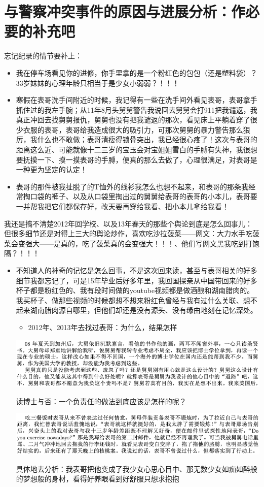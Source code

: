 \documentclass[9pt, b5paper]{article}
\begin{document}
\section{与警察冲突事件的原因与进展分析：作必要的补充吧}
\label{sec:org03eb449}
忘记纪录的情节要补上：
\begin{itemize}
\item 我在停车场看见你的进修，你手里拿的是一个粉红色的包包（还是塑料袋）？33岁妹妹的心理年龄只相当于是少女小弱弱？！！！

\item 寒假在表哥洗手间附近的时候，我记得有一些在洗手间外看见表哥，表哥拿手抓住过的我左手腕；从11年8月头舅舅警告我说回去舅舅会打911把我谴返，我真正冲回去找舅舅报仇，舅舅也没有把我谴返的那次，看见床上平躺着穿了很少衣服的表哥，表哥给我造成很大的吸引力，可那次舅舅的暴力警告那么狠厉，我什么也不敢做；表哥清瘦得锁骨突出，我已经很心疼了！这次与表哥的距离这么近、可能就像十二三岁的宝玉会对宝姐姐雪白的手膊有失神，我很想要抚摸一下、摸一摸表哥的手膊，便真的那么去做了，心理很满足，对表哥是一种更为坚定的认定！
\item 表哥的那件被我扯脱了的T恤外的线衫我怎么也想不起来，和表哥的那条我经常掏口袋的裤子、以及从口袋里掏出过的舅舅给表哥的表哥的小本儿，表哥要一并帮我把它们都保存好，改天要再穿给我看、把小本儿拿给我看！
\end{itemize}
我还是搞不清楚2012年回学校、以及13年春天的那些个舆论到底是怎么回事儿：
但很多细节还是对得上三大的舆论炒作，喜欢吃沙拉菠菜——网文：大力水手吃菠菜会变强大——是真的，吃了菠菜真的会变强大！！！、他们写网文黑我吃到打饱隔？！！！
\begin{itemize}
\item 不知道人的神奇的记忆是怎么回事，不是这次回来读，甚至与表哥相关的好多细节我都忘记了，可是15年毕业后好多年里，我回国探亲从中国带回来的好多杯子都是粉红色的、我有段时间做的youtube视频都是做酒酿和湖南腊肉的。我买杯子、做那些视频的时候都想不想来粉红色曾经与我有过什么关联、想不起来湖南腊肉源自哪里，但他们却还是没有源头、没有缘由地刻在记忆深处。 
\begin{itemize}
\item 2012年、2013年去找过表哥：为什么，结果怎样
\end{itemize}
\begin{center}
\includegraphics[width=.9\linewidth]{./pic/p1p136-5.png}
\end{center}
读博士与否：一个负责任的做法到底应该是怎样的呢？
\begin{center}
\includegraphics[width=.9\linewidth]{./pic/p1p125-2.png}
\end{center}
具体地去分析：我表哥把他变成了我少女心思心目中、那无数少女如痴如醉般的梦想般的身材，看得好养眼看到好舒服只想求抱抱
\end{itemize}
\end{document}
